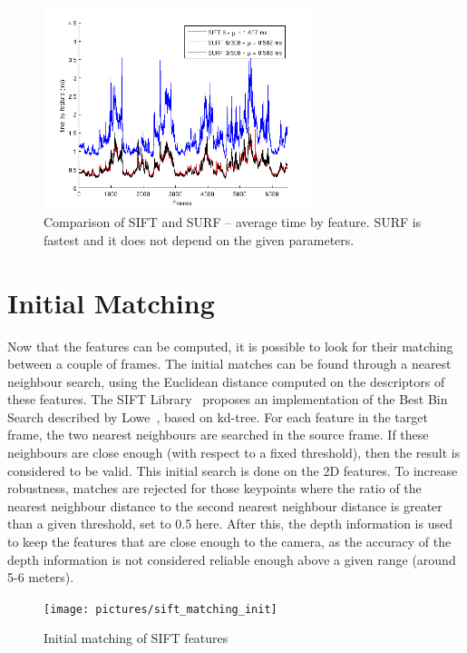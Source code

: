 \begin{figure}[H]
\begin{center}
\includegraphics[width=0.7\textwidth]{figures/stats_features_tbf}
\caption{Comparison of SIFT and SURF -- average time by feature. SURF is fastest and it does not depend on the given parameters.}
\end{center}
\end{figure}

\clearpage
\section{Initial Matching}

Now that the features can be computed, it is possible to look for their matching between a couple of frames. The initial matches can be found through a nearest neighbour search, using the Euclidean distance computed on the descriptors of these features.  
The SIFT Library~\cite{hess_sift} proposes an implementation of the Best Bin Search described by Lowe~\cite{lowe_2004_sift}, based on kd-tree. For each feature in the target frame, the two nearest neighbours are searched in the source frame. If these neighbours are close enough (with respect to a fixed threshold), then the result is considered to be valid. This initial search is done on the 2D features. To increase robustness, matches are rejected for those keypoints where the ratio of the nearest neighbour distance to the second nearest neighbour distance is greater than a given threshold, set to 0.5 here. After this, the depth information is used to keep the features that are close enough to the camera, as the accuracy of the depth information is not considered reliable enough above a given range (around 5-6 meters).

\begin{figure}[H]
\centering
\texttt{[image: pictures/sift\_matching\_init]}
\caption{Initial matching of SIFT features}
\end{figure}

